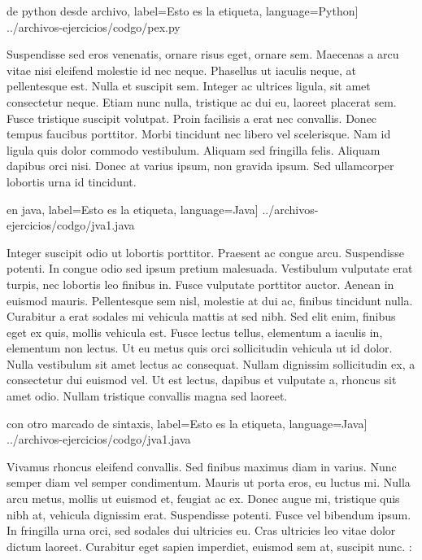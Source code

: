 \lstset{style=colorB, inputencoding=utf8/latin1}
 de python desde archivo, label=Esto es la etiqueta, language=Python] {../archivos-ejercicios/codgo/pex.py}

Suspendisse sed eros venenatis, ornare risus eget, ornare sem. Maecenas a arcu vitae nisi eleifend molestie id nec neque. Phasellus ut iaculis neque, at pellentesque est. Nulla et suscipit sem. Integer ac ultrices ligula, sit amet consectetur neque. Etiam nunc nulla, tristique ac dui eu, laoreet placerat sem. Fusce tristique suscipit volutpat. Proin facilisis a erat nec convallis. Donec tempus faucibus porttitor. Morbi tincidunt nec libero vel scelerisque. Nam id ligula quis dolor commodo vestibulum. Aliquam sed fringilla felis. Aliquam dapibus orci nisi. Donec at varius ipsum, non gravida ipsum. Sed ullamcorper lobortis urna id tincidunt.

\lstset{style=colorB,inputencoding=utf8/latin1}
 en java,  label=Esto es la etiqueta, language=Java] {../archivos-ejercicios/codgo/jva1.java}

Integer suscipit odio ut lobortis porttitor. Praesent ac congue arcu. Suspendisse potenti. In congue odio sed ipsum pretium malesuada. Vestibulum vulputate erat turpis, nec lobortis leo finibus in. Fusce vulputate porttitor auctor. Aenean in euismod mauris. Pellentesque sem nisl, molestie at dui ac, finibus tincidunt nulla. Curabitur a erat sodales mi vehicula mattis at sed nibh. Sed elit enim, finibus eget ex quis, mollis vehicula est. Fusce lectus tellus, elementum a iaculis in, elementum non lectus. Ut eu metus quis orci sollicitudin vehicula ut id dolor. Nulla vestibulum sit amet lectus ac consequat. Nullam dignissim sollicitudin ex, a consectetur dui euismod vel. Ut est lectus, dapibus et vulputate a, rhoncus sit amet odio. Nullam tristique convallis magna sed laoreet.

\lstset{style=colorA, inputencoding=utf8/latin1}
 con otro marcado de sintaxis, label=Esto es la etiqueta, language=Java] {../archivos-ejercicios/codgo/jva1.java}

Vivamus rhoncus eleifend convallis. Sed finibus maximus diam in varius. Nunc semper diam vel semper condimentum. Mauris ut porta eros, eu luctus mi. Nulla arcu metus, mollis ut euismod et, feugiat ac ex. Donec augue mi, tristique quis nibh at, vehicula dignissim erat. Suspendisse potenti. Fusce vel bibendum ipsum. In fringilla urna orci, sed sodales dui ultricies eu. Cras ultricies leo vitae dolor dictum laoreet. Curabitur eget sapien imperdiet, euismod sem at, suscipit nunc. :

